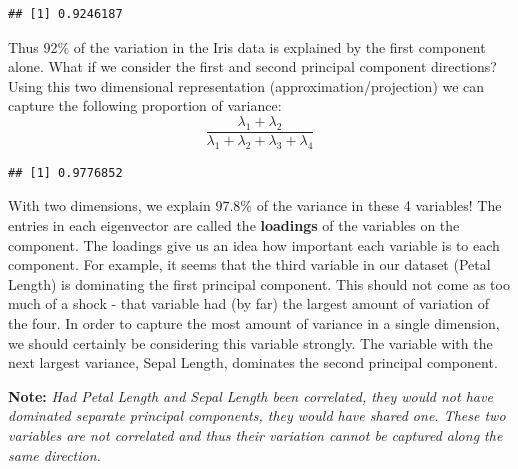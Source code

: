 \documentclass[
]{article}
\newenvironment{Shaded}{\begin{snugshade}}{\end{snugshade}}
\newcommand{\DecValTok}[1]{\textcolor[rgb]{0.00,0.00,0.81}{#1}}
\newcommand{\FunctionTok}[1]{\textcolor[rgb]{0.00,0.00,0.00}{#1}}
\newcommand{\NormalTok}[1]{#1}
\newcommand{\SpecialCharTok}[1]{\textcolor[rgb]{0.00,0.00,0.00}{#1}}
\theoremstyle{definition}
\theoremstyle{definition}
\theoremstyle{definition}
\theoremstyle{definition}
\theoremstyle{remark}
\begin{document}
\begin{Shaded}
\end{Shaded}

\begin{verbatim}
## [1] 0.9246187
\end{verbatim}

Thus 92\% of the variation in the Iris data is explained by the first component alone. What if we consider the first and second principal component directions? Using this two dimensional representation (approximation/projection) we can capture the following proportion of variance:
\[\frac{\lambda_1+\lambda_2}{\lambda_1+\lambda_2+\lambda_3+\lambda_4}\]

\begin{Shaded}
\end{Shaded}

\begin{verbatim}
## [1] 0.9776852
\end{verbatim}

With two dimensions, we explain 97.8\% of the variance in these 4 variables! The entries in each eigenvector are called the \textbf{loadings} of the variables on the component. The loadings give us an idea how important each variable is to each component. For example, it seems that the third variable in our dataset (Petal Length) is dominating the first principal component. This should not come as too much of a shock - that variable had (by far) the largest amount of variation of the four. In order to capture the most amount of variance in a single dimension, we should certainly be considering this variable strongly. The variable with the next largest variance, Sepal Length, dominates the second principal component.

\textbf{Note:} \emph{Had Petal Length and Sepal Length been correlated, they would not have dominated separate principal components, they would have shared one. These two variables are not correlated and thus their variation cannot be captured along the same direction.}
\end{document}
